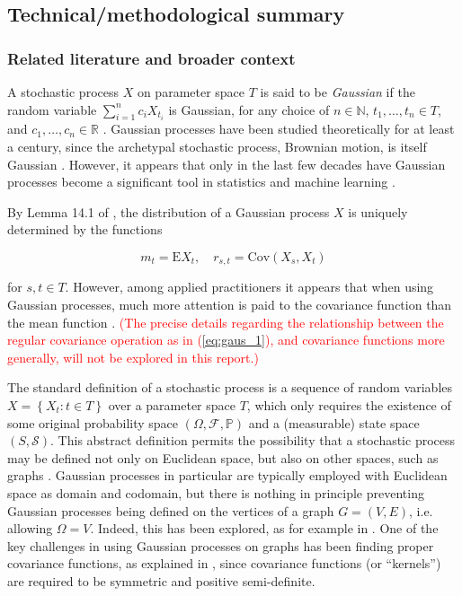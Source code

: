 \newpage
\subsection{Technical/methodological summary}

\subsubsection{Related literature and broader context}


A stochastic process $X$ on parameter space $T$ is said to be \textit{Gaussian} if the random variable $\sum_{i = 1}^n c_i X_{t_i}$ is Gaussian, for any choice of $n \in \mathbb N$, $t_1, \dots, t_n \in T$, and $c_1, \dots, c_n \in \mathbb R$ \cite{kallenberg}. Gaussian processes have been studied theoretically for at least a century, since the archetypal stochastic process, Brownian motion, is itself Gaussian \cite{kallenberg}. However, it appears that only in the last few decades have Gaussian processes become a significant tool in statistics and machine learning \cite{rw}.

By Lemma 14.1 of \cite{kallenberg}, the distribution of a Gaussian process $X$ is uniquely determined by the functions

\begin{equation}\label{eq:gaus_1}
    m_t = \mathrm E X_t, \quad r_{s, t} = \text{Cov}(X_s, X_t)
\end{equation}

for $s, t \in T$. However, among applied practitioners it appears that when using Gaussian processes, much more attention is paid to the covariance function than the mean function \cite{garnett_bayesoptbook_2023}. \textcolor{red}{(The precise details regarding the relationship between the regular covariance operation as in (\ref{eq:gaus_1}), and covariance functions more generally, will not be explored in this report.)}

The standard definition of a stochastic process is a sequence of random variables $X = \left\{ X_t \colon t \in T \right\}$ over a parameter space $T$, which only requires the existence of some original probability space $\left( \Omega, \mathcal F, \mathbb P \right)$ and a (measurable) state space $(S, \mathcal S)$. This abstract definition permits the possibility that a stochastic process may be defined not only on Euclidean space, but also on other spaces, such as graphs \cite{grimmett}. Gaussian processes in particular are typically employed with Euclidean space as domain and codomain, but there is nothing in principle preventing Gaussian processes being defined on the vertices of a graph $G = (V, E)$, i.e. allowing $\Omega = V$. Indeed, this has been explored, as for example in \cite{kondor2002diffusion}. One of the key challenges in using Gaussian processes on graphs has been finding proper covariance functions, as explained in \cite{kondor2002diffusion}, since covariance functions (or ``kernels'') are required to be symmetric and positive semi-definite.

